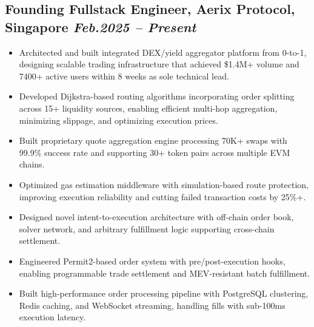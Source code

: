 \documentclass[11pt,a4paper]{article}
\newcommand{\resumeItem}[1]{\item\small{#1}}
\begin{document}
\subsection{Founding Fullstack Engineer, Aerix Protocol, Singapore \hfill \textit{Feb.2025 -- Present}}
\begin{itemize}[leftmargin=*, itemsep=1pt, parsep=0pt]
    \resumeItem{Architected and built integrated DEX/yield aggregator platform from 0-to-1, designing scalable trading infrastructure that achieved \$1.4M+ volume and 7400+ active users within 8 weeks as sole technical lead.}
    \resumeItem{Developed Dijkstra-based routing algorithms incorporating order splitting across 15+ liquidity sources, enabling efficient multi-hop aggregation, minimizing slippage, and optimizing execution prices.}
    \resumeItem{Built proprietary quote aggregation engine processing 70K+ swaps with 99.9\% success rate and supporting 30+ token pairs across multiple EVM chains.}
    \resumeItem{Optimized gas estimation middleware with simulation-based route protection, improving execution reliability and cutting failed transaction costs by 25\%+.}
    \resumeItem{Designed novel intent-to-execution architecture with off-chain order book, solver network, and arbitrary fulfillment logic supporting cross-chain settlement.}
    \resumeItem{Engineered Permit2-based order system with pre/post-execution hooks, enabling programmable trade settlement and MEV-resistant batch fulfillment.}
    \resumeItem{Built high-performance order processing pipeline with PostgreSQL clustering, Redis caching, and WebSocket streaming, handling fills with sub-100ms execution latency.}

\end{itemize}
\end{document}
